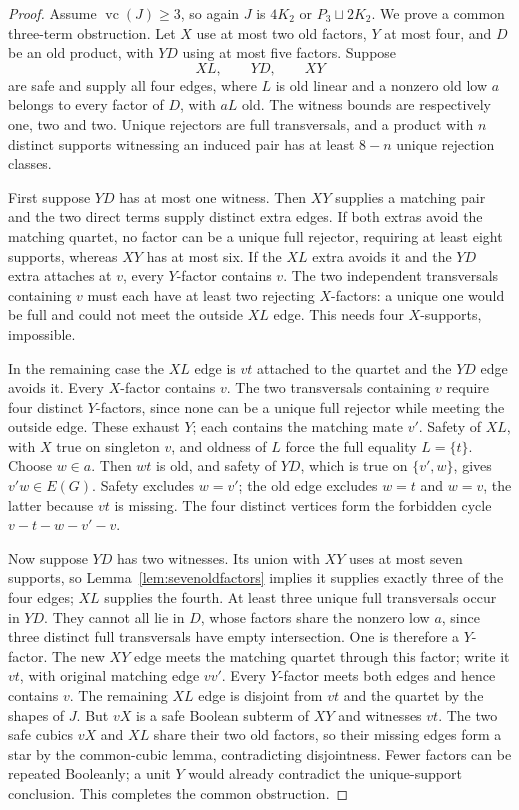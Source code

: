 \documentclass[11pt]{article}
\newcommand{\vc}{\operatorname{vc}}
\theoremstyle{definition}
\theoremstyle{remark}
\begin{document}
\begin{proof}
Assume $\vc(J)\ge3$, so again $J$ is $4K_2$ or $P_3\sqcup2K_2$. We prove a common three-term obstruction. Let $X$ use at most two old factors, $Y$ at most four, and $D$ be an old product, with $YD$ using at most five factors. Suppose
\[
 XL,\qquad YD,\qquad XY
\]
are safe and supply all four edges, where $L$ is old linear and a nonzero old low $a$ belongs to every factor of $D$, with $aL$ old. The witness bounds are respectively one, two and two. Unique rejectors are full transversals, and a product with $n$ distinct supports witnessing an induced pair has at least $8-n$ unique rejection classes.

First suppose $YD$ has at most one witness. Then $XY$ supplies a matching pair and the two direct terms supply distinct extra edges. If both extras avoid the matching quartet, no factor can be a unique full rejector, requiring at least eight supports, whereas $XY$ has at most six. If the $XL$ extra avoids it and the $YD$ extra attaches at $v$, every $Y$-factor contains $v$. The two independent transversals containing $v$ must each have at least two rejecting $X$-factors: a unique one would be full and could not meet the outside $XL$ edge. This needs four $X$-supports, impossible.

In the remaining case the $XL$ edge is $vt$ attached to the quartet and the $YD$ edge avoids it. Every $X$-factor contains $v$. The two transversals containing $v$ require four distinct $Y$-factors, since none can be a unique full rejector while meeting the outside edge. These exhaust $Y$; each contains the matching mate $v'$. Safety of $XL$, with $X$ true on singleton $v$, and oldness of $L$ force the full equality $L=\{t\}$. Choose $w\in a$. Then $wt$ is old, and safety of $YD$, which is true on $\{v',w\}$, gives $v'w\in E(G)$. Safety excludes $w=v'$; the old edge excludes $w=t$ and $w=v$, the latter because $vt$ is missing. The four distinct vertices form the forbidden cycle $v-t-w-v'-v$.

Now suppose $YD$ has two witnesses. Its union with $XY$ uses at most seven supports, so Lemma~\ref{lem:sevenoldfactors} implies it supplies exactly three of the four edges; $XL$ supplies the fourth. At least three unique full transversals occur in $YD$. They cannot all lie in $D$, whose factors share the nonzero low $a$, since three distinct full transversals have empty intersection. One is therefore a $Y$-factor. The new $XY$ edge meets the matching quartet through this factor; write it $vt$, with original matching edge $vv'$. Every $Y$-factor meets both edges and hence contains $v$. The remaining $XL$ edge is disjoint from $vt$ and the quartet by the shapes of $J$. But $vX$ is a safe Boolean subterm of $XY$ and witnesses $vt$. The two safe cubics $vX$ and $XL$ share their two old factors, so their missing edges form a star by the common-cubic lemma, contradicting disjointness. Fewer factors can be repeated Booleanly; a unit $Y$ would already contradict the unique-support conclusion. This completes the common obstruction.


\end{proof}
\end{document}
